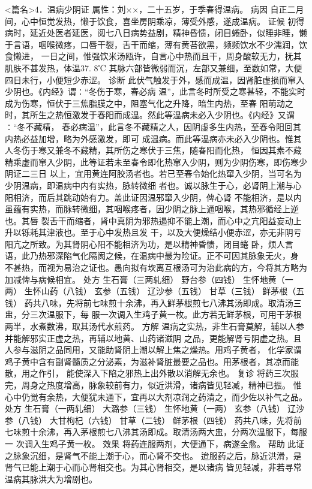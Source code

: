 \documentclass[a4paper,12pt,UTF8,twoside]{ctexbook}
\begin{document}
<篇名>4．温病少阴证
属性：刘××，二十五岁，于季春得温病。 
病因 自正二月间，心中恒觉发热，懒于饮食，喜坐房阴乘凉，薄受外感，遂成温病。 
证候 初得病时，延近处医者延医，阅七八日病势益剧，精神昏愦，闭目蜷卧，似睡非睡，懒 
于言语，咽喉微疼，口唇干裂，舌干而缩，薄有黄苔欲黑，频频饮水不少濡润，饮食懒进， 
一日之间，惟强饮米汤瓯许，自言心中热而且干，周身酸软无力，抚其肌肤不甚发热，体温37. 8℃ 
其脉六部皆微弱而沉，左部又兼细，至数如常，大便四日未行，小便短少赤涩。 
诊断 此伏气触发于外，感而成温，因肾脏虚损而窜入少阴也。《内经》谓∶“冬伤于寒，春必病 
温”，此言冬时所受之寒甚轻，不能实时成为伤寒，恒伏于三焦脂膜之中，阻塞气化之升降，暗生内热，至春 
阳萌动之时，其所生之热恒激发于春阳而成温。然此等温病未必入少阴也。《内经》又谓∶“冬不藏精， 
春必病温”，此言冬不藏精之人，因阴虚多生内热，至春令阳回其内热必益加增，略为外感激发，即可 
成温病。而此等温病亦未必入少阴也。惟其人冬伤于寒又兼冬不藏精，其所伤之寒伏于三焦，随春阳而化热， 
恒因其素不藏精乘虚而窜入少阴，此等证若未至春令即化热窜入少阴，则为少阴伤寒，即伤寒少阴证二三日 
以上，宜用黄连阿胶汤者也。若已至春令始化热窜入少阴，当可名为少阴温病，即温病中内有实热，脉转微细 
者也。诚以脉生于心，必肾阴上潮与心阳相济，而后其跳动始有力。盖此证因温邪窜入少阴，俾心肾 
不能相济，是以内虽蕴有实热，而脉转微细，其咽喉疼者，因少阴之脉上通咽喉，其热邪循经上逆也。其唇 
裂舌干而缩者，肾中真阴为邪热遏抑不能上潮，而心中之亢阳益妄动上升以铄耗其津液也。至于心中发热且发 
干，以及大便燥结小便赤涩，亦无非阴亏阳亢之所致。为其肾阴心阳不能相济为功，是以精神昏愦，闭目蜷 
卧，烦人言语，此乃热邪深陷气化隔阂之候，在温病中最为险证。正不可因其脉象无火，身 
不甚热，而视为易治之证也。愚向拟有坎离互根汤可为治此病的方，今将其方略为加减俾与病候相宜。 
处方 生石膏（三两轧细） 野台参（四钱） 生怀地黄（一两） 生怀山药（八钱） 
玄参（五钱） 辽沙参（五钱） 甘草（三钱） 鲜茅根（五钱） 
药共八味，先将前七味煎十余沸，再入鲜茅根煎七八沸其汤即成。取清汤三盅，分三次温服下，每 
服一次调入生鸡子黄一枚。此方若无鲜茅根，可用干茅根两半，水煮数沸，取其汤代水煎药。 
方解 温病之实热，非生石膏莫解，辅以人参并能解邪实正虚之热，再辅以地黄、山药诸滋阴 
之品，更能解肾亏阴虚之热。且人参与滋阴之品同用，又能助肾阴上潮以解上焦之燥热。用鸡子黄者， 
化学家谓鸡子黄中含有副肾髓质之分泌素，为滋补肾脏最要之品也。用茅根者，其凉而能散，用之作引， 
能使深入下陷之邪热上出外散以消解无余也。 
复诊 将药三次服完，周身之热度增高，脉象较前有力，似近洪滑，诸病皆见轻减，精神已振。 
惟心中仍觉有余热，大便犹未通下，宜再以大剂凉润之药清之，而少佐以补气之品。 
处方 生石膏（一两轧细） 大潞参（三钱） 生怀地黄（一两） 玄参（八钱） 
辽沙参（八钱） 大甘枸杞（六钱） 甘草（二钱） 鲜茅根（四钱） 
药共八味，先将前七味煎十余沸，再入茅根煎七八沸其汤即成。取清汤两大盅，分两次温服下，每服一 
次调入生鸡子黄一枚。 
效果 将药连服两剂，大便通下，病遂全愈。 
帮助 此证之脉象沉细，是肾气不能上潮于心，而心肾不交也。 
迨服药之后，脉近洪滑，是肾气已能上潮于心而心肾相交也。为其心肾相交，是以诸病 
皆见轻减，非若寻常温病其脉洪大为增剧也。 
\end{document}
